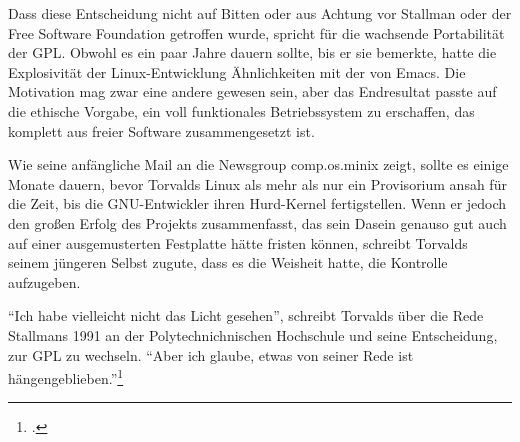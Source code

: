 Dass diese Entscheidung nicht auf Bitten oder aus Achtung vor Stallman oder der Free Software Foundation getroffen wurde, spricht für die wachsende Portabilität der GPL. Obwohl es ein paar Jahre dauern sollte, bis er sie bemerkte, hatte die Explosivität der Linux-Entwicklung Ähnlichkeiten mit der von Emacs. Die Motivation mag zwar eine andere gewesen sein, aber das Endresultat passte auf die ethische Vorgabe, ein voll funktionales Betriebssystem zu erschaffen, das komplett aus freier Software zusammengesetzt ist.

Wie seine anfängliche Mail an die Newsgroup comp.os.minix zeigt, sollte es einige Monate dauern, bevor Torvalds Linux als mehr als nur ein Provisorium ansah für die Zeit, bis die GNU-Entwickler ihren Hurd-Kernel fertigstellen. Wenn er jedoch den großen Erfolg des Projekts zusammenfasst, das sein Dasein genauso gut auch auf einer ausgemusterten Festplatte hätte fristen können, schreibt Torvalds seinem jüngeren Selbst zugute, dass es die Weisheit hatte, die Kontrolle aufzugeben.

"`Ich habe vielleicht nicht das Licht gesehen"', schreibt Torvalds über die Rede Stallmans 1991 an der Polytechnichnischen Hochschule und seine Entscheidung, zur GPL zu wechseln. "`Aber ich glaube, etwas von seiner Rede ist hängengeblieben."'\footcite[][S.\,59]{tojff}
